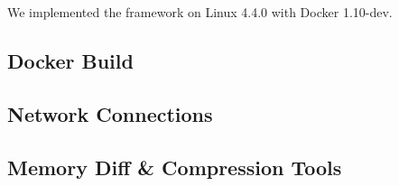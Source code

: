 



We implemented the framework on Linux 4.4.0 with Docker 1.10-dev. 


\subsection{Docker Build}

\subsection{Network Connections}

\subsection{Memory Diff \& Compression Tools}
